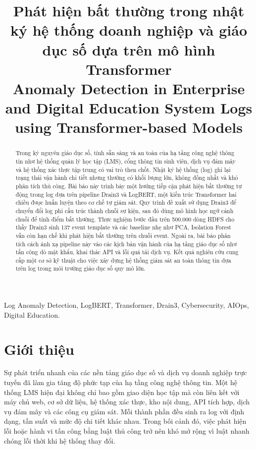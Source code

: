 \documentclass[conference]{IEEEtran}
\begin{document}
\title{Phát hiện bất thường trong nhật ký hệ thống doanh nghiệp và giáo dục số dựa trên mô hình Transformer\\
\large Anomaly Detection in Enterprise and Digital Education System Logs using Transformer-based Models}

\author{
}

\maketitle

\begin{abstract}
Trong kỷ nguyên giáo dục số, tính sẵn sàng và an toàn của hạ tầng công nghệ thông tin như hệ thống quản lý học tập (LMS), cổng thông tin sinh viên, dịch vụ đám mây và hệ thống xác thực tập trung có vai trò then chốt. Nhật ký hệ thống (log) ghi lại trạng thái vận hành chi tiết nhưng thường có khối lượng lớn, không đồng nhất và khó phân tích thủ công. Bài báo này trình bày một hướng tiếp cận phát hiện bất thường tự động trong log dựa trên pipeline Drain3 và LogBERT, một kiến trúc Transformer hai chiều được huấn luyện theo cơ chế tự giám sát. Quy trình đề xuất sử dụng Drain3 để chuyển đổi log phi cấu trúc thành chuỗi sự kiện, sau đó dùng mô hình học ngữ cảnh chuỗi để tính điểm bất thường. Thực nghiệm bước đầu trên 500.000 dòng HDFS cho thấy Drain3 sinh 137 event template và các baseline nhẹ như PCA, Isolation Forest vẫn còn hạn chế khi phát hiện bất thường trên chuỗi event. Ngoài ra, bài báo phân tích cách ánh xạ pipeline này vào các kịch bản vận hành của hạ tầng giáo dục số như tấn công dò mật khẩu, khai thác API và lỗi quá tải dịch vụ. Kết quả nghiên cứu cung cấp một cơ sở kỹ thuật cho việc xây dựng hệ thống giám sát an toàn thông tin dựa trên log trong môi trường giáo dục số quy mô lớn.
\end{abstract}

\begin{IEEEkeywords}
Log Anomaly Detection, LogBERT, Transformer, Drain3, Cybersecurity, AIOps, Digital Education.
\end{IEEEkeywords}

\section{Giới thiệu}
Sự phát triển nhanh của các nền tảng giáo dục số và dịch vụ doanh nghiệp trực tuyến đã làm gia tăng độ phức tạp của hạ tầng công nghệ thông tin. Một hệ thống LMS hiện đại không chỉ bao gồm giao diện học tập mà còn liên kết với máy chủ web, cơ sở dữ liệu, hệ thống xác thực, kho nội dung, API tích hợp, dịch vụ đám mây và các công cụ giám sát. Mỗi thành phần đều sinh ra log với định dạng, tần suất và mức độ chi tiết khác nhau. Trong bối cảnh đó, việc phát hiện lỗi hoặc hành vi tấn công bằng luật thủ công trở nên khó mở rộng vì luật nhanh chóng lỗi thời khi hệ thống thay đổi.
\end{document}
